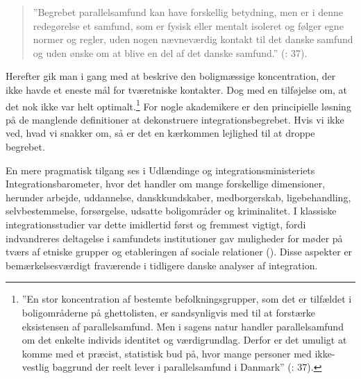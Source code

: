 \documentclass[
]{book}
\begin{document}
\begin{quote}
''Begrebet parallelsamfund kan have forskellig betydning, men er i denne redegørelse et samfund, som er fysisk eller mentalt isoleret og følger egne normer og regler, uden nogen nævneværdig kontakt til det danske samfund og uden ønske om at blive en del af det danske samfund.'' (: 37).
\end{quote}

Herefter gik man i gang med at beskrive den boligmæssige koncentration, der ikke havde et eneste mål for tværetniske kontakter. Dog med en tilføjelse om, at det nok ikke var helt optimalt.\footnote{''En stor koncentration af bestemte befolkningsgrupper, som det er tilfældet i boligområderne på ghettolisten, er sandsynligvis med til at forstærke eksistensen af parallelsamfund. Men i sagens natur handler parallelsamfund om det enkelte individs identitet og værdigrundlag. Derfor er det umuligt at komme med et præcist, statistisk bud på, hvor mange personer med ikke-vestlig baggrund der reelt lever i parallelsamfund i Danmark'' (: 37).} For nogle akademikere er den principielle løsning på de manglende definitioner at dekonstruere integrationsbegrebet. Hvis vi ikke ved, hvad vi snakker om, så er det en kærkommen lejlighed til at droppe begrebet.

En mere pragmatisk tilgang ses i Udlændinge og integrationsministeriets Integrationsbarometer, hvor det handler om mange forskellige dimensioner, herunder arbejde, uddannelse, danskkundskaber, medborgerskab, ligebehandling, selvbestemmelse, forsørgelse, udsatte boligområder og kriminalitet. I klassiske integrationsstudier var dette imidlertid først og fremmest vigtigt, fordi indvandreres deltagelse i samfundets institutioner gav muligheder for møder på tværs af etniske grupper og etableringen af sociale relationer (). Disse aspekter er bemærkelsesværdigt fraværende i tidligere danske analyser af integration.
\end{document}
